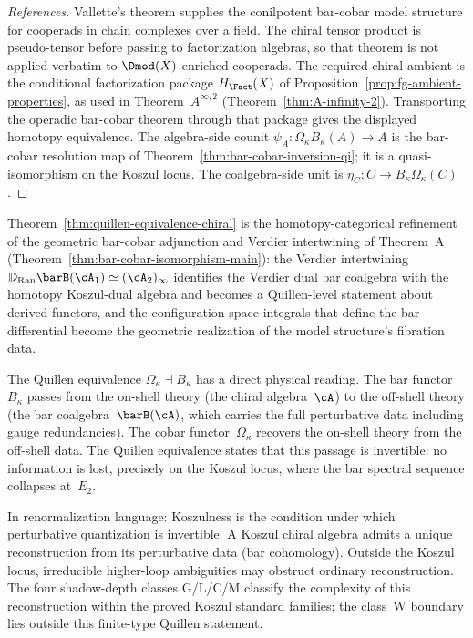 \begin{proof}[References]
Vallette's theorem supplies the conilpotent bar-cobar model structure
for cooperads in chain complexes over a field. The chiral tensor
product is pseudo-tensor before passing to factorization algebras, so
that theorem is not applied verbatim to $\Dmod(X)$-enriched cooperads.
The required chiral ambient is the conditional factorization package
$H_{\Fact}(X)$ of Proposition~\ref{prop:fg-ambient-properties}, as
used in Theorem~$A^{\infty,2}$
(Theorem~\ref{thm:A-infinity-2}). Transporting the operadic bar-cobar
theorem through that package gives the displayed homotopy equivalence.
The algebra-side counit
$\psi_A\colon\Omega_\kappa B_\kappa(A)\to A$ is the bar-cobar
resolution map of Theorem~\ref{thm:bar-cobar-inversion-qi}; it is a
quasi-isomorphism on the Koszul locus. The coalgebra-side unit is
$\eta_C\colon C\to B_\kappa\Omega_\kappa(C)$.
\end{proof}

\begin{remark}
\label{rem:quillen-verdier-connection}
Theorem~\ref{thm:quillen-equivalence-chiral} is the
homotopy-categorical refinement of the geometric bar-cobar adjunction
and Verdier intertwining of
Theorem~A
(Theorem~\ref{thm:bar-cobar-isomorphism-main}): the Verdier
intertwining $\mathbb{D}_{\operatorname{Ran}} \barB(\cA_1) \simeq
(\cA_2)_\infty$ identifies the Verdier dual bar coalgebra with the
homotopy Koszul-dual algebra and becomes a Quillen-level statement about derived
functors, and the configuration-space integrals that define the bar
differential become the geometric realization of the model structure's
fibration data.
\end{remark}

\begin{remark}
\label{rem:quillen-physical}
The Quillen equivalence $\Omega_\kappa \dashv B_\kappa$ has a direct
physical reading. The bar functor~$B_\kappa$ passes from the on-shell
theory (the chiral algebra~$\cA$) to the off-shell theory (the bar
coalgebra~$\barB(\cA)$, which carries the full perturbative data
including gauge redundancies). The cobar functor~$\Omega_\kappa$
recovers the on-shell theory from the off-shell data. The Quillen
equivalence states that this passage is invertible: no information is
lost, precisely on the Koszul locus, where the bar spectral sequence
collapses at~$E_2$.

In renormalization language: Koszulness is the condition under which
perturbative quantization is invertible. A Koszul chiral algebra
admits a unique reconstruction from its perturbative data (bar
cohomology). Outside the Koszul locus, irreducible higher-loop
ambiguities may obstruct ordinary reconstruction. The four
shadow-depth classes G/L/C/M classify the complexity of this
reconstruction within the proved Koszul standard families; the
class~W boundary lies outside this finite-type Quillen statement.
\end{remark}


